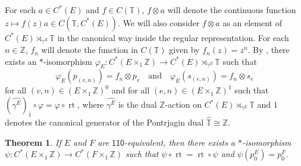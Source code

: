 \documentclass[12pt]{amsbook}%
\newcommand{\lt}{\operatorname{rt}}
\renewcommand{\phi}{\varphi}
\newtheorem{theor}{Theorem}[section]
\theoremstyle{defin}
\theoremstyle{remark}
\numberwithin{equation}{chapter}
\numberwithin{theor}{section}
\newcommand{\TT}{\mathbb{T}}
\newcommand{\ZZ}{\mathbb{Z}}
\newcommand{\xyz}[1]{\mbox{$\mathsf{#1}$}}
\begin{document}
For each $a \in C^*(E)$ and $f \in C(\TT)$, $f \otimes a$ will denote the continuous function $z \mapsto f(z) a\in C(\TT,C^*(E))$.  We will also consider $f \otimes a$ as an element of $C^*(E) \rtimes_{\gamma^E} \TT$ in the canonical way inside the regular representation. For each $n \in \ZZ$, $f_n$ will denote the function in $C(\TT)$ given by $f_n(z) = z^n$.  By \cite[Lemma~3.1]{irws:ckigm}, there exists an $*$-isomorphism $\phi_E \colon C^*(E \times_1 \ZZ) \to C^*(E) \rtimes_{\gamma^E} \TT$ such that 
$$
\phi_E( p_{(v,n)} ) = f_n \otimes p_v \quad \text{and} \quad \phi_E( s_{(e,n)} ) = f_n \otimes s_{e}
$$
for all $(v,n) \in (E \times_1\ZZ)^0$ and for all $(e,n) \in (E \times_1 \ZZ)^1$ such that $(\widehat{\gamma^E})_1 \circ \phi = \phi \circ \lt$, where $\widehat{\gamma^E}$ is the dual $\ZZ$-action on $C^*(E) \rtimes_{\gamma^E} \mathbb{T}$ and $1$ denotes the canonical generator of the Pontrjagin dual $\widehat{\TT} \cong \ZZ$.
 


\begin{theor}\label{raecor}
If $E$ and $F$ are \xyz{110}-equivalent, then there exists a $*$-isomorphism $\psi \colon C^*(E\times_1\ZZ) \to C^*(F\times_1\ZZ)$ such that $\psi \circ \lt = \lt \circ \psi$ and $\psi ( p^E_0 )= p_0^F$.
\end{theor}

\end{document}
